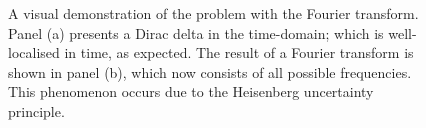 \begin{figure}[htpb]
	\centering\capstart{}
	\hfill
	\caption[
		A Dirac delta function and the result of a Fourier transform
	]{
		A visual demonstration of the problem with the Fourier transform.
		Panel (a) presents a Dirac delta in the time-domain; which is well-localised in time, as expected.
		The result of a Fourier transform is shown in panel (b), which now consists of all possible frequencies.
		This phenomenon occurs due to the Heisenberg uncertainty principle.
	}\label{fig:chapter2_dirac_fourier}
\end{figure}
